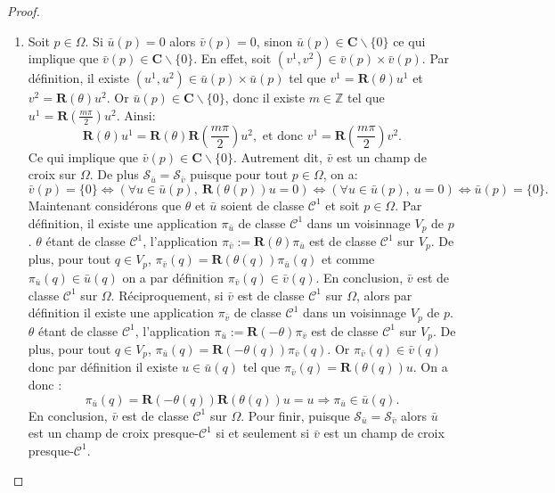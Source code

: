 \begin{proof}
\begin{enumerate}
\item Soit $p\in\Omega$. Si $\bar{u}(p)=0$ alors $\bar{v}(p)=0$, sinon $\bar{u}(p)\in\mathbf{C}\backslash\{0\}$ ce qui implique que $\bar{v}(p)\in\mathbf{C}\backslash\{0\}$. En effet, soit $(v^1, v^2)\in\bar{v}(p)\times\bar{v}(p)$. Par définition, il existe $(u^1, u^2)\in\bar{u}(p)\times\bar{u}(p)$ tel que $v^1=\mathbf{R}(\theta)u^1$ et $v^2=\mathbf{R}(\theta)u^2$. Or $\bar{u}(p)\in\mathbf{C}\backslash\{0\}$, donc il existe $m\in\mathbb{Z}$ tel que $u^1=\mathbf{R}\left(\frac{m\pi}{2}\right)u^2$. Ainsi:
$$
\mathbf{R}(\theta)u^1=\mathbf{R}(\theta)\mathbf{R}\left(\frac{m\pi}{2}\right)u^2,\mbox{ et donc }
v^1=\mathbf{R}\left(\frac{m\pi}{2}\right)v^2.
$$
Ce qui implique que $\bar{v}(p)\in\mathbf{C}\backslash\{0\}$. Autrement dit, $\bar{v}$ est un champ de croix sur $\Omega$. De plus $\mathcal{S}_{\bar{u}}=\mathcal{S}_{\bar{v}}$ puisque pour tout $p\in\Omega$, on a:
$$\bar{v}(p)=\{0\} \Leftrightarrow \left(\forall u\in \bar{u}(p),~\mathbf{R}(\theta(p)) u=0\right)\Leftrightarrow \left(\forall u\in \bar{u}(p),~u=0\right) \Leftrightarrow \bar{u}(p)=\{0\}.$$
Maintenant considérons que $\theta$  et $\bar{u}$ soient de classe $\mathcal{C}^1$ et soit $p\in\Omega$. Par définition, il existe une application $\pi_{\bar{u}}$ de classe $\mathcal{C}^1$ dans un voisinnage $V_p$ de $p$. $\theta$ étant de classe $\mathcal{C}^1$, l'application $\pi_{\bar{v}}:=\mathbf{R}(\theta)\pi_{\bar{u}}$ est de classe $\mathcal{C}^1$ sur $V_p$. De plus, pour tout $q\in V_p$, $\pi_{\bar{v}}(q)=\mathbf{R}(\theta(q))\pi_{\bar{u}}(q)$ et comme $\pi_{\bar{u}}(q)\in\bar{u}(q)$ on a par définition $\pi_{\bar{v}}(q)\in\bar{v}(q)$. En conclusion, $\bar{v}$ est de classe $\mathcal{C}^1$ sur $\Omega$. Réciproquement, si $\bar{v}$ est de classe $\mathcal{C}^1$ sur $\Omega$, alors par définition il existe une application $\pi_{\bar{v}}$ de classe $\mathcal{C}^1$ dans un voisinnage $V_p$ de $p$. $\theta$ étant de classe $\mathcal{C}^1$, l'application $\pi_{\bar{u}}:=\mathbf{R}(-\theta)\pi_{\bar{v}}$ est de classe $\mathcal{C}^1$ sur $V_p$. De plus, pour tout $q\in V_p$, $\pi_{\bar{u}}(q)=\mathbf{R}(-\theta(q))\pi_{\bar{v}}(q)$. Or $\pi_{\bar{v}}(q)\in\bar{v}(q)$ donc par définition il existe $u\in\bar{u}(q)$ tel que $\pi_{\bar{v}}(q)=\mathbf{R}(\theta(q))u$. On a donc :
$$
\pi_{\bar{u}}(q)=\mathbf{R}(-\theta(q))\mathbf{R}(\theta(q))u=u\Longrightarrow\pi_{\bar{u}}\in\bar{u}(q).
$$
En conclusion, $\bar{v}$ est de classe $\mathcal{C}^1$ sur $\Omega$. Pour finir, puisque $\mathcal{S}_{\bar{u}}=\mathcal{S}_{\bar{v}}$ alors $\bar{u}$ est un champ de croix presque-$\mathcal{C}^1$ si et seulement si $\bar{v}$ est un champ de croix presque-$\mathcal{C}^1$.
\end{enumerate}
\end{proof}


